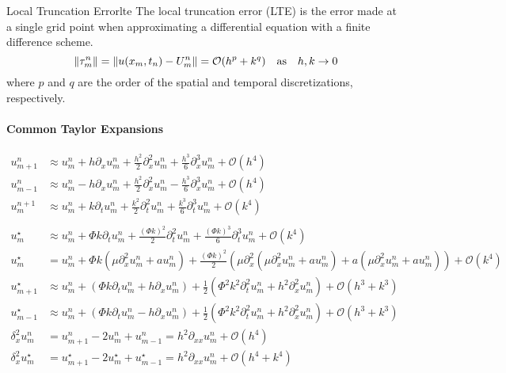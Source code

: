 \begin{definition}{Local Truncation Error}{lte}
  The local truncation error (LTE) is the error made at a single grid point when approximating a differential equation with a finite difference scheme.
  \[
    \lVert\tau_m^n\rVert = \lVert u(x_m, t_n) - U_m^n\rVert = \mathcal{O}(h^p + k^q) \quad \text{as} \quad h, k \to 0
  \]
  where \(p\) and \(q\) are the order of the spatial and temporal discretizations, respectively.
\end{definition}


\paragraph{Common Taylor Expansions}

\begin{align*}
  u_{m+1}^n & \approx u_m^n + h \partial_x u_m^n + \frac{h^2}{2} \partial_x^2 u_m^n + \frac{h^3}{6} \partial_x^3 u_m^n + \mathcal{O}(h^4) \tag{T1} \label{eq:taylor_forward} \\
  u_{m-1}^n & \approx u_m^n - h \partial_x u_m^n + \frac{h^2}{2} \partial_x^2 u_m^n - \frac{h^3}{6} \partial_x^3 u_m^n + \mathcal{O}(h^4) \tag{T2} \label{eq:taylor_backward} \\
  u_m^{n+1} & \approx u_m^n + k \partial_t u_m^n + \frac{k^2}{2} \partial_t^2 u_m^n + \frac{k^3}{6} \partial_t^3 u_m^n + \mathcal{O}(k^4) \tag{T3} \label{eq:taylor_time} \\                                                                                                          \\
  u_m^\star & \approx u_m^n + \Phi k \partial_t u_m^n + \frac{(\Phi k)^2}{2} \partial_t^2 u_m^n + \frac{(\Phi k)^3}{6} \partial_t^3 u_m^n + \mathcal{O}(k^4) \tag{T4} \label{eq:taylor_intermediate} \\
  u_m^\star & = u_m^n + \Phi k \left(\mu \partial_x^2 u_m^n + a u_m^n\right) + \frac{(\Phi k)^2}{2} \left(\mu \partial_x^2 \left(\mu \partial_x^2 u_m^n + a u_m^n\right) + a \left(\mu \partial_x^2 u_m^n + a u_m^n\right)\right) + \mathcal{O}(k^4) \tag{T5} \label{eq:taylor_pde} \\
  u_{m+1}^\star & \approx u_m^n + \left(\Phi k \partial_t u_m^n + h \partial_x u_m^n\right) + \frac{1}{2}\left(\Phi^2 k^2 \partial_t^2 u_m^n + h^2 \partial_x^2 u_m^n\right) + \mathcal{O}(h^3 + k^3) \tag{T6} \label{eq:taylor_mixed_forward} \\
  u_{m-1}^\star & \approx u_m^n + \left(\Phi k \partial_t u_m^n - h \partial_x u_m^n\right) + \frac{1}{2}\left(\Phi^2 k^2 \partial_t^2 u_m^n + h^2 \partial_x^2 u_m^n\right) + \mathcal{O}(h^3 + k^3) \tag{T7} \label{eq:taylor_mixed_backward} \\[2ex]
  \delta_x^2 u_m^n &= u_{m+1}^n - 2u_m^n + u_{m-1}^n = h^2\partial_{xx}u_m^n + \mathcal{O}(h^4) \tag{T8} \label{eq:central_diff} \\
  \delta_x^2 u_m^\star &= u_{m+1}^\star - 2u_m^\star + u_{m-1}^\star = h^2\partial_{xx}u_m^n + \mathcal{O}(h^4 + k^4) \tag{T9} \label{eq:central_diff_star}
\end{align*}

